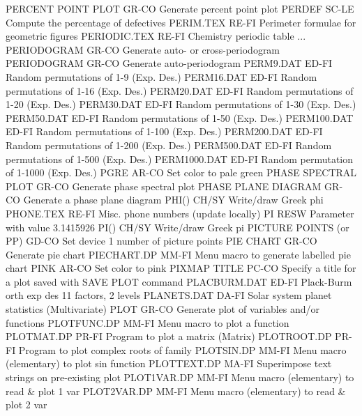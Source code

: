PERCENT POINT PLOT          GR-CO Generate percent point plot
PERDEF                      SC-LE Compute the percentage of defectives
PERIM.TEX                   RE-FI Perimeter formulae for geometric figures
PERIODIC.TEX                RE-FI Chemistry periodic table
... PERIODOGRAM             GR-CO Generate auto- or cross-periodogram
PERIODOGRAM                 GR-CO Generate auto-periodogram
PERM9.DAT                   ED-FI Random permutations of 1-9    (Exp. Des.)
PERM16.DAT                  ED-FI Random permutations of 1-16   (Exp. Des.)
PERM20.DAT                  ED-FI Random permutations of 1-20   (Exp. Des.)
PERM30.DAT                  ED-FI Random permutations of 1-30   (Exp. Des.)
PERM50.DAT                  ED-FI Random permutations of 1-50   (Exp. Des.)
PERM100.DAT                 ED-FI Random permutations of 1-100  (Exp. Des.)
PERM200.DAT                 ED-FI Random permutations of 1-200  (Exp. Des.)
PERM500.DAT                 ED-FI Random permutations of 1-500  (Exp. Des.)
PERM1000.DAT                ED-FI Random permutation  of 1-1000 (Exp. Des.)
PGRE                        AR-CO Set color to pale green
PHASE SPECTRAL PLOT         GR-CO Generate phase spectral plot
PHASE PLANE DIAGRAM         GR-CO Generate a phase plane diagram
PHI()                       CH/SY Write/draw Greek phi
PHONE.TEX                   RE-FI Misc. phone numbers (update locally)
PI                          RESW  Parameter with value 3.1415926
PI()                        CH/SY Write/draw Greek pi
PICTURE POINTS (or PP)      GD-CO Set device 1 number of picture points
PIE CHART                   GR-CO Generate pie chart
PIECHART.DP                 MM-FI Menu macro to generate labelled pie chart
PINK                        AR-CO Set color to pink
PIXMAP TITLE                PC-CO Specify a title for a plot saved with SAVE PLOT command
PLACBURM.DAT                ED-FI Plack-Burm orth exp des 11 factors, 2 levels
PLANETS.DAT                 DA-FI Solar system planet statistics (Multivariate)
PLOT                        GR-CO Generate plot of variables and/or functions
PLOTFUNC.DP                 MM-FI Menu macro to plot a function
PLOTMAT.DP                  PR-FI Program to plot a matrix (Matrix)
PLOTROOT.DP                 PR-FI Program to plot complex roots of family
PLOTSIN.DP                  MM-FI Menu macro (elementary) to plot sin function
PLOTTEXT.DP                 MA-FI Superimpose text strings on pre-existing plot
PLOT1VAR.DP                 MM-FI Menu macro (elementary) to read & plot 1 var
PLOT2VAR.DP                 MM-FI Menu macro (elementary) to read & plot 2 var
